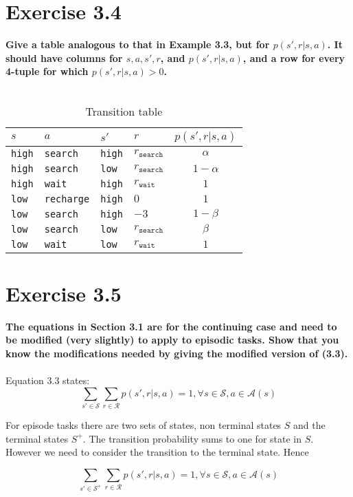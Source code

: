 \documentclass[a4paper,11pt]{article}
\numberwithin{equation}{section}
\theoremstyle{remark}
\begin{document}
\section{Exercise 3.4}
\textbf{
Give a table analogous to that in Example 3.3, but for $p(s',r| s,a)$. It
should have columns for $s, a, s', r$, and $p(s', r | s, a)$, and a row for every 4-tuple for which
$p(s',r| s,a) > 0$. 
}
\\ \\
\begin{table}[h!]
\centering
\begin{tabular}{llll|c}
    $s$ & $a$ & $s'$ & $r$ & $p(s', r | s, a)$ \\
    \hline
     \texttt{high}& \texttt{search}&  \texttt{high}&  $r_{\texttt{search}}$& $\alpha$  \\
     \texttt{high}& \texttt{search}&  \texttt{low}&   $r_{\texttt{search}}$& $1 - \alpha$ \\
     \texttt{high}& \texttt{wait}&  \texttt{high}&   $r_{\texttt{wait}}$&  $1$ \\
     \texttt{low}& \texttt{recharge}&   \texttt{high}&    $0$&   $1$\\
     \texttt{low}& \texttt{search}&  \texttt{high}&  $-3$& $1 - \beta$  \\
     \texttt{low}& \texttt{search}&  \texttt{low}&   $r_{\texttt{search}}$& $\beta $\\
     \texttt{low}& \texttt{wait}&  \texttt{low}&   $r_{\texttt{wait}}$&  $1$
\end{tabular}
\caption{Transition table}
\end{table}


\section{Exercise 3.5}
\textbf{
The equations in Section 3.1 are for the continuing case and need to be
modified (very slightly) to apply to episodic tasks. Show that you know the modifications
needed by giving the modified version of (3.3). 
}
\\ \\
Equation 3.3 states:
\begin{equation*}
\sum_{s'\in \mathcal{S}}\sum_{r\in \mathcal{R}}{p(s',r|s,a)=1}, \forall s\in \mathcal{S}, a\in \mathcal{A}(s)
\end{equation*}

For episode tasks there are two sets of states, non terminal states $S$ and the terminal states $S^+$. The transition probability sums to one for state in $S$. However we need to consider the transition to the terminal state. Hence

\begin{equation*}
\sum_{s'\in \mathcal{S}^+}\sum_{r\in \mathcal{R}}{p(s',r|s,a)=1}, \forall s\in \mathcal{S}, a\in \mathcal{A}(s)
\end{equation*}
\end{document}
